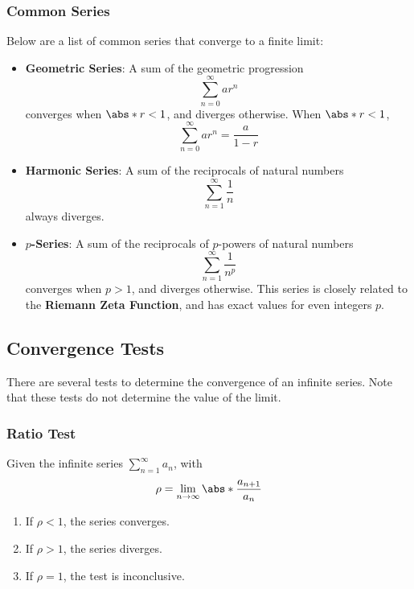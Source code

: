 \documentclass{article}
\begin{document}
\subsubsection{Common Series}
Below are a list of common series that converge to a finite limit:
\begin{itemize}
    \item \textbf{Geometric Series}: A sum of the geometric progression
    \begin{equation*}
        \sum_{n=0}^{\infty} a r^n
    \end{equation*}
    converges when \(\abs*{r} < 1\), and diverges otherwise. When
    \(\abs*{r} < 1\),
    \begin{equation*}
        \sum_{n=0}^{\infty} a r^n = \frac{a}{1 - r}
    \end{equation*}
    \item \textbf{Harmonic Series}: A sum of the reciprocals of natural numbers
    \begin{equation*}
        \sum_{n=1}^{\infty} \frac{1}{n}
    \end{equation*}
    always diverges.
    \item \textbf{\(p\)-Series}: A sum of the reciprocals of \(p\)-powers of
    natural numbers
    \begin{equation*}
        \sum_{n=1}^{\infty} \frac{1}{n^p}
    \end{equation*}
    converges when \(p > 1\), and diverges otherwise. This series is
    closely related to the \textbf{Riemann Zeta Function}, and has
    exact values for even integers \(p\).
\end{itemize}
\subsection{Convergence Tests}
There are several tests to determine the convergence of an infinite series.
Note that these tests do not determine the value of the limit.
\subsubsection{Ratio Test}
Given the infinite series \(\sum_{n=1}^{\infty} a_n\), with
\begin{equation*}
    \rho = \lim_{n \to \infty} \abs*{\frac{a_{n+1}}{a_n}}
\end{equation*}
\begin{enumerate}[label=(\arabic*)]
    \item If \(\rho < 1\), the series converges.
    \item If \(\rho > 1\), the series diverges.
    \item If \(\rho = 1\), the test is inconclusive.
\end{enumerate}
\end{document}
